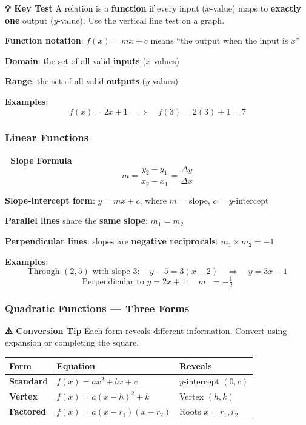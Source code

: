 \documentclass[
  letterpaper,
  DIV=11,
  numbers=noendperiod]{scrreprt}
\theoremstyle{definition}
\theoremstyle{remark}
\begin{document}
\textbf{💡 Key Test} A relation is a \textbf{function} if every input
(\(x\)-value) maps to \textbf{exactly one} output (\(y\)-value). Use the
vertical line test on a graph.

\textbf{Function notation}: \(f(x) = mx + c\) means ``the output when
the input is \(x\)''

\textbf{Domain}: the set of all valid \textbf{inputs} (\(x\)-values)

\textbf{Range}: the set of all valid \textbf{outputs} (\(y\)-values)

\textbf{Examples}:
\[f(x) = 2x + 1 \quad \Rightarrow \quad f(3) = 2(3)+1 = 7\]

\subsubsection*{Linear Functions}\label{linear-functions}

\textbf{📝 Slope Formula}
\[m = \frac{y_2 - y_1}{x_2 - x_1} = \frac{\Delta y}{\Delta x}\]

\textbf{Slope-intercept form}: \(y = mx + c\), where \(m\) = slope,
\(c\) = \(y\)-intercept

\textbf{Parallel lines} share the \textbf{same slope}: \(m_1 = m_2\)

\textbf{Perpendicular lines}: slopes are \textbf{negative reciprocals}:
\(m_1 \times m_2 = -1\)

\textbf{Examples}:
\[\text{Through }(2,5)\text{ with slope }3: \quad y - 5 = 3(x-2) \quad \Rightarrow \quad y = 3x - 1\]
\[\text{Perpendicular to }y=2x+1: \quad m_\perp = -\tfrac{1}{2}\]

\subsubsection*{Quadratic Functions --- Three
Forms}\label{quadratic-functions-three-forms}

\textbf{⚠️ Conversion Tip} Each form reveals different information.
Convert using expansion or completing the square.

\begin{longtable}[]{@{}lll@{}}
\toprule\noalign{}
Form & Equation & Reveals \\
\midrule\noalign{}
\endhead
\bottomrule\noalign{}
\endlastfoot
\textbf{Standard} & \(f(x) = ax^2 + bx + c\) & \(y\)-intercept
\((0, c)\) \\
\textbf{Vertex} & \(f(x) = a(x-h)^2 + k\) & Vertex \((h, k)\) \\
\textbf{Factored} & \(f(x) = a(x-r_1)(x-r_2)\) & Roots
\(x = r_1, r_2\) \\
\end{longtable}
\end{document}

